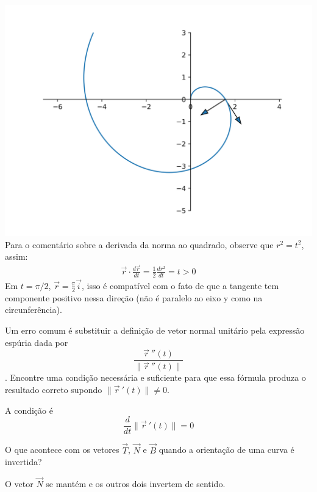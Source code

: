 \begin{resp}
\includegraphics[scale=.8]{./cap_curvas/figs//espiral_lista_a1} 
Para o comentário sobre a derivada da norma ao quadrado, observe que $r^2=t^2$, assim:
\begin{eqnarray*}
\vec{r}\cdot\frac{d\vec{r}}{dt}=\frac{1}{2}\frac{d r^2}{dt}=t>0
\end{eqnarray*}
Em $t=\pi/2$, $\vec{r} = \frac{\pi}{2}\vec{i}$, isso é compatível com o fato de que a tangente tem componente positivo nessa direção (não é paralelo ao eixo y como na circunferência).
\end{resp}


\begin{exer}Um erro comum é substituir a definição de vetor normal unitário pela expressão espúria dada por $$\frac{\vec{r}\!~''(t)}{\|\vec{r}\!~''(t)\|}$$. Encontre uma condição necessária e suficiente para que essa fórmula produza o resultado correto supondo $\|\vec{r}\!~'(t)\|\neq 0$.

\end{exer}
\begin{resp}
  A condição é $$\frac{d}{dt}\|\vec{r}\!~'(t)\|=0$$
\end{resp}

\begin{exer} O que acontece com os vetores $\vec{T}$, $\vec{N}$ e $\vec{B}$ quando a orientação de uma curva é invertida?
\end{exer}
\begin{resp} O vetor $\vec{N}$ se mantém e os outros dois invertem de sentido.
\end{resp}




